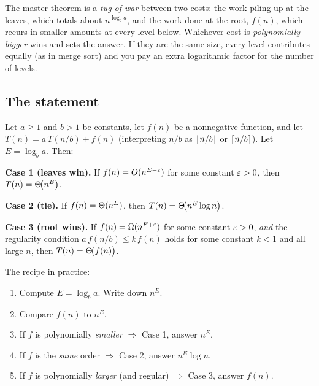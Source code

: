 \begin{intuitionbox}
The master theorem is a \emph{tug of war} between two costs: the work piling up at
the leaves, which totals about $n^{\log_b a}$, and the work done at the root,
$f(n)$, which recurs in smaller amounts at every level below. Whichever cost is \emph{polynomially
bigger} wins and sets the answer. If they are the same size, every level
contributes equally (as in merge sort) and you pay an extra logarithmic factor for
the number of levels.
\end{intuitionbox}

\subsection{The statement}

\begin{theorem}
\label{ch04:master}
Let $a \ge 1$ and $b > 1$ be constants, let $f(n)$ be a nonnegative function, and
let $T(n) = a\,T(n/b) + f(n)$ (interpreting $n/b$ as $\lfloor n/b\rfloor$ or $\lceil n/b\rceil$).
Let $E = \log_b a$. Then:

\textbf{Case 1 (leaves win).} If $f(n) = O(n^{E-\varepsilon})$ for some constant $\varepsilon>0$,
then $T(n) = \Theta\!\big(n^{E}\big)$.

\textbf{Case 2 (tie).} If $f(n) = \Theta(n^{E})$, then
$T(n) = \Theta\!\big(n^{E}\log n\big)$.

\textbf{Case 3 (root wins).} If $f(n) = \Omega(n^{E+\varepsilon})$ for some constant
$\varepsilon>0$, \emph{and} the regularity condition $a\,f(n/b) \le k\,f(n)$ holds for
some constant $k<1$ and all large $n$, then $T(n) = \Theta\!\big(f(n)\big)$.
\end{theorem}

\begin{focusbox}
The recipe in practice:
\begin{enumerate}
\item Compute $E = \log_b a$. Write down $n^{E}$.
\item Compare $f(n)$ to $n^{E}$.
\item If $f$ is polynomially \emph{smaller} $\Rightarrow$ Case 1, answer $n^{E}$.
\item If $f$ is the \emph{same} order $\Rightarrow$ Case 2, answer $n^{E}\log n$.
\item If $f$ is polynomially \emph{larger} (and regular) $\Rightarrow$ Case 3,
      answer $f(n)$.
\end{enumerate}
\end{focusbox}

